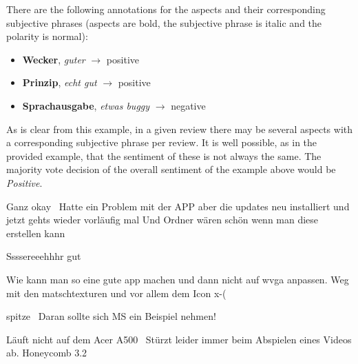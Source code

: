 There are the following annotations for the aspects and their corresponding subjective phrases
(aspects are bold, the subjective phrase is italic and the polarity is normal):


\begin{itemize}
  \item \textbf{Wecker}, \textit{guter} $\rightarrow$ positive
  \item \textbf{Prinzip}, \textit{echt gut} $\rightarrow$ positive
  \item \textbf{Sprachausgabe}, \textit{etwas buggy} $\rightarrow$ negative
\end{itemize}

As is clear from this example, in a given review there may be several aspects with a corresponding
subjective phrase per review.
It is well possible, as in the provided example, that the sentiment of these is not always the
same.
The majority vote decision of the overall sentiment of the example above would be \emph{Positive}.

\begin{examples}
\item Ganz okay \textbar\textbar\ Hatte ein Problem mit der APP aber die updates neu installiert und jetzt gehts wieder vorläufig mal Und Ordner wären schön wenn man diese erstellen kann \hfill{}
\end{examples}

\begin{examples}
\item Ssssereeehhhr gut \hfill{}
\end{examples}

\begin{examples}
\item Wie kann man so eine gute app machen und dann nicht auf wvga anpassen. Weg mit den matschtexturen und vor allem dem Icon x-( \hfill{}
\end{examples}

\begin{examples}
\item spitze \textbar\textbar\ Daran sollte sich MS ein Beispiel nehmen! \hfill{}
\end{examples}

\begin{examples}
\item Läuft nicht auf dem Acer A500 \textbar\textbar\ Stürzt leider immer beim Abspielen eines Videos ab. Honeycomb 3.2 \hfill{}
\end{examples}


